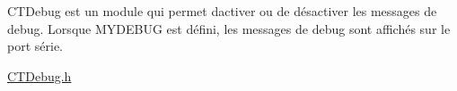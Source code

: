 CTDebug est un module qui permet d\textquotesingle{}activer ou de désactiver les messages de debug. Lorsque MYDEBUG est défini, les messages de debug sont affichés sur le port série.

\mbox{\hyperlink{_c_t_debug_8h}{CTDebug.\+h}} 
